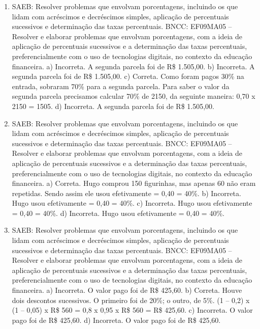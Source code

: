 \begin{enumerate}
\item
SAEB: Resolver problemas que envolvam porcentagens, incluindo os
que lidam com acréscimos e decréscimos simples, aplicação de
percentuais sucessivos e determinação das taxas percentuais.
BNCC: EF09MA05 -- Resolver e elaborar problemas que envolvam porcentagens, com a ideia de aplicação de percentuais sucessivos e a determinação das taxas percentuais, preferencialmente com o uso de tecnologias digitais, no contexto da educação financeira.
a) Incorreta. A segunda parcela foi de R\$ 1.505,00.
b) Incorreta. A segunda parcela foi de R\$ 1.505,00.
c) Correta. Como foram pagos 30\% na entrada, sobraram 70\% para a segunda 
parcela. Para saber o valor da segunda parcela precisamos calcular 70\% de
2150, da seguinte maneira: 0,70 x 2150 = 1505.
d) Incorreta. A segunda parcela foi de R\$ 1.505,00.

\item
SAEB: Resolver problemas que envolvam porcentagens, incluindo os
que lidam com acréscimos e decréscimos simples, aplicação de
percentuais sucessivos e determinação das taxas percentuais.
BNCC: EF09MA05 -- Resolver e elaborar problemas que envolvam porcentagens, com a ideia de aplicação de percentuais sucessivos e a determinação das taxas percentuais, preferencialmente com o uso de tecnologias digitais, no contexto da educação financeira.
a) Correta. Hugo comprou 150 figurinhas, mas apenas 60 não eram repetidas.
Sendo assim ele usou efetivamente  = 0,40 = 40\%.
b) Incorreta. Hugo usou efetivamente  = 0,40 = 40\%.
c) Incorreta. Hugo usou efetivamente  = 0,40 = 40\%.
d) Incorreta. Hugo usou efetivamente  = 0,40 = 40\%.

\item
SAEB: Resolver problemas que envolvam porcentagens, incluindo os
que lidam com acréscimos e decréscimos simples, aplicação de
percentuais sucessivos e determinação das taxas percentuais.
BNCC: EF09MA05 -- Resolver e elaborar problemas que envolvam porcentagens, com a ideia de aplicação de percentuais sucessivos e a determinação das taxas percentuais, preferencialmente com o uso de tecnologias digitais, no contexto da educação financeira.
a) Incorreta. O valor pago foi de R\$ 425,60.
b) Correta. Houve dois descontos sucessivos. O primeiro foi de 20\%; o outro,
de 5\%. (1 -- 0,2) x (1 -- 0,05) x R\$ 560 = 0,8 x 0,95 x R\$ 560 = R\$ 425,60.
c) Incorreta. O valor pago foi de R\$ 425,60.
d) Incorreta. O valor pago foi de R\$ 425,60.
\end{enumerate}

